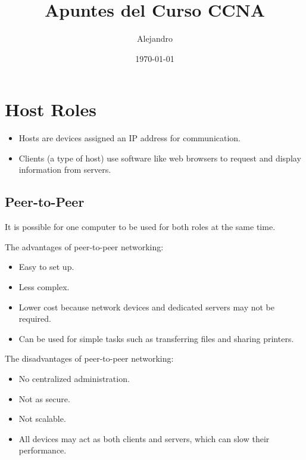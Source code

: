 \documentclass[a4paper,11pt]{article}
\title{Apuntes del Curso CCNA}
\author{Alejandro}
\date{\today}
\begin{document}
\maketitle
\tableofcontents
\newpage

\section{Host Roles}
\begin{itemize}
    \item Hosts are devices assigned an IP address for communication.
    \item Clients (a type of host) use software like web browsers to request and display information from servers.
\end{itemize}

\subsection{Peer-to-Peer}
It is possible for one computer to be used for both roles at the same time.

\begin{tcolorbox}[colframe=gray!80, colback=gray!20, coltitle=black, title=Peer-to-Peer]
    The advantages of peer-to-peer networking:
    \begin{itemize}
        \item Easy to set up.
        \item Less complex.
        \item Lower cost because network devices and dedicated servers may not be required.
        \item Can be used for simple tasks such as transferring files and sharing printers.
    \end{itemize}
    The disadvantages of peer-to-peer networking:
    \begin{itemize}
        \item No centralized administration.
        \item Not as secure.
        \item Not scalable.
        \item All devices may act as both clients and servers, which can slow their performance.
    \end{itemize}
\end{tcolorbox}
\end{document}
